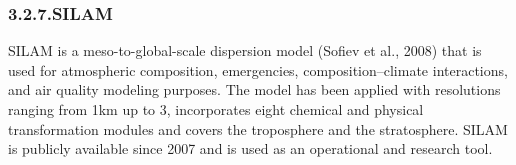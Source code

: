 \documentclass[9pt]{report}
\begin{document}
\begin{table}[h!]%
\begin{mdcenter}%
{}%
\end{mdcenter}\label{mocage-portfolio}%
\end{table}%

\subsubsection{3.2.7.\hspace*{0.5em}SILAM}\label{sec-silam}%

\noindent{}SILAM is a meso-to-global-scale dispersion model (Sofiev et al., 2008) that is used for atmospheric composition, emergencies, composition–climate interactions, and air quality modeling purposes. 
The model has been applied with resolutions ranging from 1km up to 3\textdegree{}, incorporates eight chemical and physical transformation modules and covers the troposphere and the stratosphere. 
SILAM is publicly available since 2007 and is used as an operational and research tool.%
\end{document}
